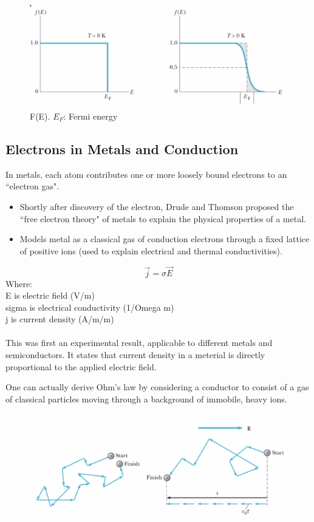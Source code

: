 \documentclass[class=article,crop=false]{standalone}
\begin{document}
\begin{figure}[h!]
	\centering
	\includegraphics[width=.8\linewidth]{./Images/fermi-dirac.png}
	\caption{F(E). $E_F$: Fermi energy}
\end{figure}

\subsection{Electrons in Metals and Conduction}
In metals, each atom contributes one or more loosely bound electrons to an ``electron gas". 
\begin{itemize}
	\item Shortly after discovery of the electron, Drude and Thomson proposed the ``free electron theory" of metals to explain the physical properties of a metal.
	\item Models metal as a classical gas of conduction electrons through a fixed lattice of positive ions (used to explain electrical and thermal conductivities).
\end{itemize}

\begin{result}
	$$ \vec{j} = \sigma \vec{E} $$
	Where: \\
	E is electric field (V/m) \\
	sigma is electrical conductivity (1/Omega m) \\
	j is current density (A/m/m) \\
	\\

	This was first an experimental result, applicable to different metals and semiconductors. It states that current density in a meterial is directly proportional to the applied electric field.
\end{result}

One can actually derive Ohm's law by considering a conductor to consist of a gas of classical particles moving through a background of immobile, heavy ions.

\begin{figure}[h!]
	\centering
	\includegraphics[width=.8\linewidth]{./Images/ohms.png}
	\caption{}
\end{figure}
\end{document}
